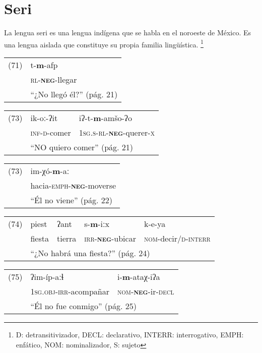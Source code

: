 \section*{Seri}

\noindent La lengua seri es una lengua indígena que se habla en el noroeste de México. Es una lengua aislada que constituye su propia familia lingüística.
\footnote{D: detransitivizador, DECL: declarativo, INTERR: interrogativo, EMPH: enfático, NOM: nominalizador, S: sujeto}
\vspace{0.5cm}

{\setmainfont{Charis SIL} 

\begin{tabular}{ll}
(71) & t-\textbf{m}-afp \\
& \textsc{rl}-\textsc{\textbf{neg}}-llegar \\
& ``¿No llegó él?'' (pág. 21)
\end{tabular} \vspace{0.5cm}

\begin{tabular}{lll}
(73) & ik-oː-ʔit & iʔ-t-\textbf{m}-amšo-ʔo \\
& \textsc{inf-d}-comer & \textsc{1sg.s-rl-\textbf{neg}-}querer-\textsc{x} \\
& \multicolumn{2}{l}{``NO quiero comer'' (pág. 21)}
\end{tabular} \vspace{0.5cm}

\begin{tabular}{ll}
(73) & im-χó-\textbf{m}-aː \\
& hacia-\textsc{emph-\textbf{neg}}-moverse \\
& ``Él no viene'' (pág. 22)
\end{tabular} \vspace{0.5cm}

\begin{tabular}{lllll}
(74) & piest & ʔant & s-\textbf{m}-iːx & k-e-ya  \\
& fiesta & tierra & \textsc{irr-\textbf{neg}}-ubicar & \textsc{nom}-decir/\textsc{d-interr} \\
& \multicolumn{4}{l}{``¿No habrá una fiesta?'' (pág. 24)}
\end{tabular} \vspace{0.5cm}

\begin{tabular}{lll}
(75) & ʔim-íp-aːɬ & i-\textbf{m}-ataχ-iʔa \\
& \textsc{1sg.obj-irr}-acompañar & \textsc{nom-\textbf{neg}-}ir-\textsc{decl}\\
& \multicolumn{2}{l}{``Él no fue conmigo'' (pág. 25)}
\end{tabular} \vspace{0.5cm}

}

